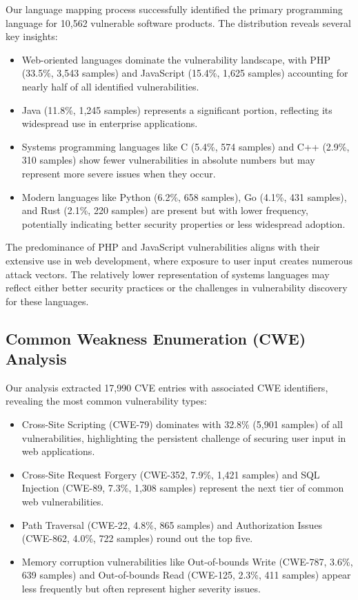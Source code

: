 Our language mapping process successfully identified the primary programming language for 10,562 vulnerable software products. The distribution reveals several key insights:

\begin{itemize}
    \item Web-oriented languages dominate the vulnerability landscape, with PHP (33.5\%, 3,543 samples) and JavaScript (15.4\%, 1,625 samples) accounting for nearly half of all identified vulnerabilities.
    \item Java (11.8\%, 1,245 samples) represents a significant portion, reflecting its widespread use in enterprise applications.
    \item Systems programming languages like C (5.4\%, 574 samples) and C++ (2.9\%, 310 samples) show fewer vulnerabilities in absolute numbers but may represent more severe issues when they occur.
    \item Modern languages like Python (6.2\%, 658 samples), Go (4.1\%, 431 samples), and Rust (2.1\%, 220 samples) are present but with lower frequency, potentially indicating better security properties or less widespread adoption.
\end{itemize}

The predominance of PHP and JavaScript vulnerabilities aligns with their extensive use in web development, where exposure to user input creates numerous attack vectors. The relatively lower representation of systems languages may reflect either better security practices or the challenges in vulnerability discovery for these languages.

\subsection{Common Weakness Enumeration (CWE) Analysis}

Our analysis extracted 17,990 CVE entries with associated CWE identifiers, revealing the most common vulnerability types:

\begin{itemize}
    \item Cross-Site Scripting (CWE-79) dominates with 32.8\% (5,901 samples) of all vulnerabilities, highlighting the persistent challenge of securing user input in web applications.
    \item Cross-Site Request Forgery (CWE-352, 7.9\%, 1,421 samples) and SQL Injection (CWE-89, 7.3\%, 1,308 samples) represent the next tier of common web vulnerabilities.
    \item Path Traversal (CWE-22, 4.8\%, 865 samples) and Authorization Issues (CWE-862, 4.0\%, 722 samples) round out the top five.
    \item Memory corruption vulnerabilities like Out-of-bounds Write (CWE-787, 3.6\%, 639 samples) and Out-of-bounds Read (CWE-125, 2.3\%, 411 samples) appear less frequently but often represent higher severity issues.
\end{itemize}

